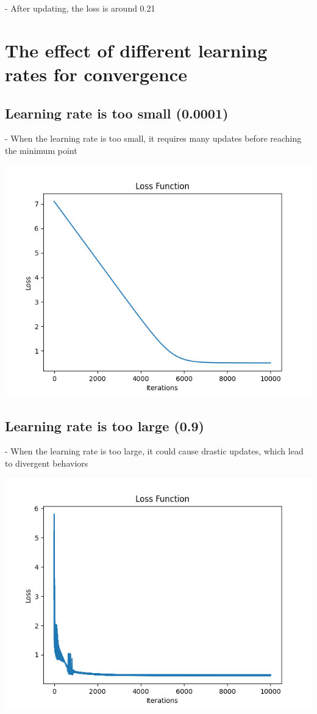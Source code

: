 \documentclass{article}
\begin{document}
- After updating, the loss is around 0.21

\section{The effect of different learning rates for convergence}
\subsection{Learning rate is too small (0.0001)}
- When the learning rate is too small, it requires many updates before reaching the minimum point
\begin{center}
    \includegraphics[width=0.5\linewidth]{3.png}
\end{center}

\subsection{Learning rate is too large (0.9)}
- When the learning rate is too large, it could cause drastic updates, which lead to divergent behaviors
\begin{center}
    \includegraphics[width=0.5\linewidth]{4.png}
\end{center}
\end{document}
